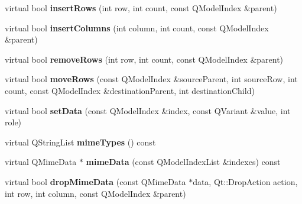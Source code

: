 \begin{DoxyCompactItemize}
\item 
virtual bool {\bfseries insert\+Rows} (int row, int count, const Q\+Model\+Index \&parent)\hypertarget{class_extendable_item_model_adff898fac861b1cc06783b1b5f810d36}{}\label{class_extendable_item_model_adff898fac861b1cc06783b1b5f810d36}

\item 
virtual bool {\bfseries insert\+Columns} (int column, int count, const Q\+Model\+Index \&parent)\hypertarget{class_extendable_item_model_aa00ea86bd42efb9e82e08da187b6c7ec}{}\label{class_extendable_item_model_aa00ea86bd42efb9e82e08da187b6c7ec}

\item 
virtual bool {\bfseries remove\+Rows} (int row, int count, const Q\+Model\+Index \&parent)\hypertarget{class_extendable_item_model_a066c457590916ebd1fb9e9694415c988}{}\label{class_extendable_item_model_a066c457590916ebd1fb9e9694415c988}

\item 
virtual bool {\bfseries move\+Rows} (const Q\+Model\+Index \&source\+Parent, int source\+Row, int count, const Q\+Model\+Index \&destination\+Parent, int destination\+Child)\hypertarget{class_extendable_item_model_a2adfee96dc6e2c8f050c1bba9a4cf170}{}\label{class_extendable_item_model_a2adfee96dc6e2c8f050c1bba9a4cf170}

\item 
virtual bool {\bfseries set\+Data} (const Q\+Model\+Index \&index, const Q\+Variant \&value, int role)\hypertarget{class_extendable_item_model_a8dd835fbda7d078df7b57253fe05712a}{}\label{class_extendable_item_model_a8dd835fbda7d078df7b57253fe05712a}

\item 
virtual Q\+String\+List {\bfseries mime\+Types} () const \hypertarget{class_extendable_item_model_a281321f07945d8340cc9a76dd906d89f}{}\label{class_extendable_item_model_a281321f07945d8340cc9a76dd906d89f}

\item 
virtual Q\+Mime\+Data $\ast$ {\bfseries mime\+Data} (const Q\+Model\+Index\+List \&indexes) const \hypertarget{class_extendable_item_model_af1f0fe8a09306876edb03619f532e459}{}\label{class_extendable_item_model_af1f0fe8a09306876edb03619f532e459}

\item 
virtual bool {\bfseries drop\+Mime\+Data} (const Q\+Mime\+Data $\ast$data, Qt\+::\+Drop\+Action action, int row, int column, const Q\+Model\+Index \&parent)\hypertarget{class_extendable_item_model_a7fae485a9730a567ab5071a788a47581}{}\label{class_extendable_item_model_a7fae485a9730a567ab5071a788a47581}

\end{DoxyCompactItemize}
